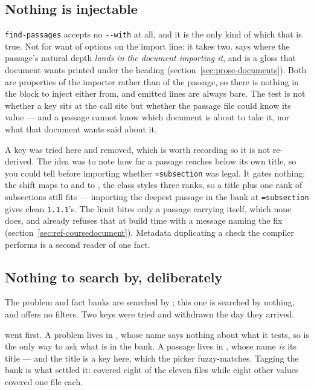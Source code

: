 \subsection*{Nothing is injectable}

\texttt{find-passages} accepts no \texttt{-{}-with} at all, and it is the only
kind of which that is true. Not for want of options on the import line: it takes
two.  says where the passage's natural depth \emph{lands in the
document importing it}, and  is a gloss that document wants printed
under the heading (section~\ref{sec:prose-documents}). Both are properties of
the importer rather than of the passage, so there is nothing in the block to
inject either from, and emitted lines are always bare. The test is not whether a
key sits at the call site but whether the passage file could know its value ---
and a passage cannot know which document is about to take it, nor what that
document wants said about it.

A  key was tried here and removed, which is worth recording so it is
not re-derived. The idea was to note how far a passage reaches below its own
title, so you could tell before importing whether
\texttt{=subsection} was legal. It gates nothing: the shift maps
 to  and  to , the
class styles three ranks, so a title plus one rank of subsections still fits ---
importing the deepest passage in the bank at \texttt{=subsection}
gives clean \texttt{1.1.1}'s. The limit bites only a passage carrying
 itself, which none does, and  already
refuses that at build time with a message naming the fix
(section~\ref{sec:ref-coursedocument}). Metadata duplicating a check the
compiler performs is a second reader of one fact.

\subsection*{Nothing to search by, deliberately}

The problem and fact banks are searched by ; this one is searched by
nothing, and  offers no filters. Two keys were tried and
withdrawn the day they arrived.

 went first. A problem lives in , whose
name says nothing about what it tests, so  is the only way to ask
what is in the bank. A passage lives in , whose name
\emph{is} its title --- and the title is a key here, which the picker
fuzzy-matches. Tagging the bank is what settled it:  covered eight
of the eleven files while eight other values covered one file each.

